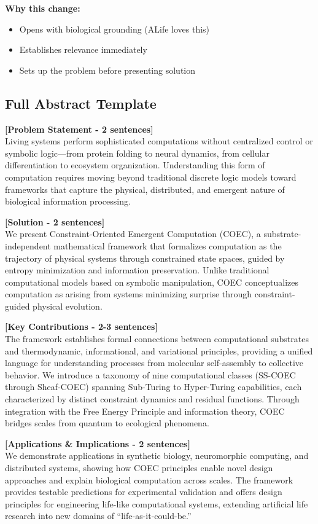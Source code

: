 \documentclass[11pt]{article}
\begin{document}
\textbf{Why this change:}
\begin{itemize}
    \item Opens with biological grounding (ALife loves this)
    \item Establishes relevance immediately
    \item Sets up the problem before presenting solution
\end{itemize}

\subsection{Full Abstract Template}

\begin{tcolorbox}[colback=add!10,colframe=add,title=New Abstract Structure]
\textbf{[Problem Statement - 2 sentences]}\\
Living systems perform sophisticated computations without centralized control or symbolic logic—from protein folding to neural dynamics, from cellular differentiation to ecosystem organization. Understanding this form of computation requires moving beyond traditional discrete logic models toward frameworks that capture the physical, distributed, and emergent nature of biological information processing.

\textbf{[Solution - 2 sentences]}\\
We present Constraint-Oriented Emergent Computation (COEC), a substrate-independent mathematical framework that formalizes computation as the trajectory of physical systems through constrained state spaces, guided by entropy minimization and information preservation. Unlike traditional computational models based on symbolic manipulation, COEC conceptualizes computation as arising from systems minimizing surprise through constraint-guided physical evolution.

\textbf{[Key Contributions - 2-3 sentences]}\\
The framework establishes formal connections between computational substrates and thermodynamic, informational, and variational principles, providing a unified language for understanding processes from molecular self-assembly to collective behavior. We introduce a taxonomy of nine computational classes (SS-COEC through Sheaf-COEC) spanning Sub-Turing to Hyper-Turing capabilities, each characterized by distinct constraint dynamics and residual functions. Through integration with the Free Energy Principle and information theory, COEC bridges scales from quantum to ecological phenomena.

\textbf{[Applications \& Implications - 2 sentences]}\\
We demonstrate applications in synthetic biology, neuromorphic computing, and distributed systems, showing how COEC principles enable novel design approaches and explain biological computation across scales. The framework provides testable predictions for experimental validation and offers design principles for engineering life-like computational systems, extending artificial life research into new domains of ``life-as-it-could-be.''
\end{tcolorbox}
\end{document}
